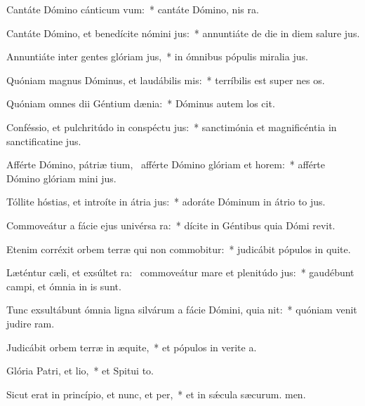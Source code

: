 \item Cantáte Dómino cánticum vum:~* cantáte Dómino, nis ra.
\item Cantáte Dómino, et benedícite nómini jus:~* annuntiáte de die in diem salure jus.
\item Annuntiáte inter gentes glóriam jus,~* in ómnibus pópulis miralia jus.
\item Quóniam magnus Dóminus, et laudábilis mis:~* terríbilis est super nes os.
\item Quóniam omnes dii Géntium dænia:~* Dóminus autem los cit.
\item Conféssio, et pulchritúdo in conspéctu jus:~* sanctimónia et magnificéntia in sanctificatine jus.
\item Afférte Dómino, pátriæ tium,~\pscross{} afférte Dómino glóriam et horem:~* afférte Dómino glóriam mini jus.
\item Tóllite hóstias, et introíte in átria jus:~* adoráte Dóminum in átrio to jus.
\item Commoveátur a fácie ejus univérsa ra:~* dícite in Géntibus quia Dómi revit.
\item Etenim corréxit orbem terræ qui non commobitur:~* judicábit pópulos in quite.
\item Læténtur cæli, et exsúltet ra:~\pscross{} commoveátur mare et plenitúdo jus:~* gaudébunt campi, et ómnia  in is sunt.
\item Tunc exsultábunt ómnia ligna silvárum a fácie Dómini, quia nit:~* quóniam venit judire ram.
\item Judicábit orbem terræ in æquite,~* et pópulos in verite a.
\item Glória Patri, et lio,~* et Spitui to.
\item Sicut erat in princípio, et nunc, et per,~* et in sǽcula sæcurum. men.
